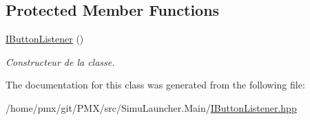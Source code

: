 \subsection*{Protected Member Functions}
\begin{DoxyCompactItemize}
\item 
\mbox{\label{classIButtonListener_a594658a76cf1fc6fde8fd1019f6ac504}} 
\hyperlink{classIButtonListener_a594658a76cf1fc6fde8fd1019f6ac504}{I\+Button\+Listener} ()
\begin{DoxyCompactList}\small\item\em Constructeur de la classe. \end{DoxyCompactList}\end{DoxyCompactItemize}


The documentation for this class was generated from the following file\+:\begin{DoxyCompactItemize}
\item 
/home/pmx/git/\+P\+M\+X/src/\+Simu\+Launcher.\+Main/\hyperlink{IButtonListener_8hpp}{I\+Button\+Listener.\+hpp}\end{DoxyCompactItemize}
